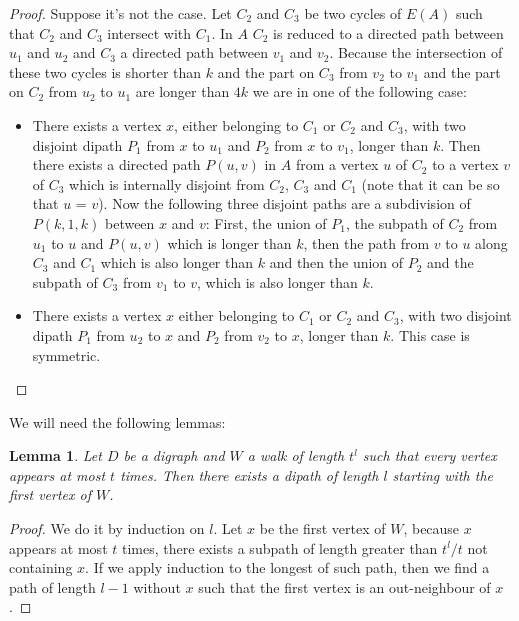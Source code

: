 \documentclass[10pt]{article}
\theoremstyle{plain}
\newtheorem{lemma}[theorem]{Lemma}
\theoremstyle{definition}
\theoremstyle{remark}
\begin{document}
\begin{proof}

Suppose it's not the case. Let $C_2$ and $C_3$ be two cycles of $E(A)$ such that $C_2$ and $C_3$ intersect with $C_1$. 
In $A$ $C_2$ is reduced to a directed path between $u_1$ and $u_2$ and $C_3$ a directed path between $v_1$ and $v_2$.
Because the intersection of these two cycles is shorter than $k$ and the part on $C_3$ from $v_2$ to $v_1$ and the part
on $C_2$ from $u_2$ to $u_1$ are longer than $4k$ we are in one of the following case:
\begin{itemize}
	\item There exists a vertex $x$, either belonging to $C_1$ or $C_2$ and $C_3$, with two disjoint dipath $P_1$ from
	$x$ to $u_1$ and $P_2$ from $x$ to $v_1$, longer than $k$. Then there exists a directed path $P(u,v)$ in $A$ from 
	a vertex $u$ of $C_2$ to a vertex $v$ of $C_3$ which is internally disjoint from  $C_2$, $C_3$ and $C_1$ 
	(note that it can be so that $u$ = $v$). Now the following three disjoint paths are a subdivision of $P(k,1,k)$ between $x$ and $v$:
	First, the union of $P_1$, the subpath of $C_2$ from $u_1$ to $u$ and $P(u,v)$ which is longer than $k$, then the path from $v$ to $u$ 
	along $C_3$ and $C_1$ which is also longer than $k$ and then the union of $P_2$ and the subpath of $C_3$ from $v_1$ to $v$, which is also longer than $k$.
	\item There exists a vertex $x$ either belonging to $C_1$ or $C_2$ and $C_3$, with two disjoint dipath $P_1$ from
	$u_2$ to $x$ and $P_2$ from $v_2$ to $x$, longer than $k$. This case is symmetric. 
\end{itemize}

\end{proof}


We will need the following lemmas: 
\begin{lemma}\label{walk}
Let $D$ be a digraph and $W$ a walk of length $t^l$ such that every vertex appears at most $t$ times.
Then there exists a dipath of length $l$ starting with the first vertex of $W$.
\end{lemma}

\begin{proof}
We do it by induction on $l$. Let $x$ be the first vertex of $W$, because $x$ appears at most $t$ times, there exists a subpath of length greater 
than $t^l/t$ not containing $x$. If we apply induction to the longest of such path, then we find a path of length $l-1$ without $x$ such that
 the first vertex is an out-neighbour of $x$.  

\end{proof}
\end{document}
